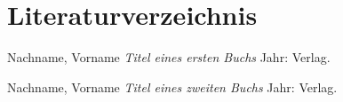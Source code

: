 \documentclass[12pt,a4paper]{article} %
\begin{document}
\newpage
\section{Literaturverzeichnis}

\begin{thebibliography}{1} %


 Nachname, Vorname {\em Titel eines ersten Buchs} Jahr: Verlag.

 Nachname, Vorname {\em Titel eines zweiten Buchs} Jahr: Verlag.



\end{thebibliography}
\end{document}
